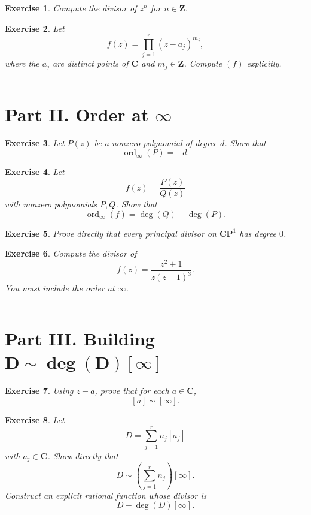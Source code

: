 \documentclass[11pt]{article}
\newtheorem{exercise}{Exercise}
\newcommand{\CP}{\mathbf{CP}^1}
\newcommand{\C}{\mathbf{C}}
\newcommand{\ord}{\operatorname{ord}}
\begin{document}
	\begin{exercise}
		Compute the divisor of \(z^n\) for \(n\in\mathbf{Z}\).
	\end{exercise}
	
	\begin{exercise}
		Let
		\[
		f(z)=\prod_{j=1}^r (z-a_j)^{m_j},
		\]
		where the \(a_j\) are distinct points of \(\C\) and \(m_j\in\mathbf{Z}\).
		Compute \((f)\) explicitly.
	\end{exercise}
	
	\hrule
	\bigskip
	
	\section*{Part II. Order at \(\infty\)}
	
	\begin{exercise}
		Let \(P(z)\) be a nonzero polynomial of degree \(d\). Show that
		\[
		\ord_\infty(P)=-d.
		\]
	\end{exercise}
	
	\begin{exercise}
		Let
		\[
		f(z)=\frac{P(z)}{Q(z)}
		\]
		with nonzero polynomials \(P,Q\). Show that
		\[
		\ord_\infty(f)=\deg(Q)-\deg(P).
		\]
	\end{exercise}
	
	\begin{exercise}
		Prove directly that every principal divisor on \(\CP\) has degree \(0\).
	\end{exercise}
	
	\begin{exercise}
		Compute the divisor of
		\[
		f(z)=\frac{z^2+1}{z(z-1)^3}.
		\]
		You must include the order at \(\infty\).
	\end{exercise}
	
	\hrule
	\bigskip
	
	\section*{Part III. Building \(\boldsymbol{D\sim \deg(D)[\infty]}\)}
	
	\begin{exercise}
		Using \(z-a\), prove that for each \(a\in\C\),
		\[
		[a]\sim [\infty].
		\]
	\end{exercise}
	
	\begin{exercise}
		Let
		\[
		D=\sum_{j=1}^r n_j[a_j]
		\]
		with \(a_j\in\C\). Show directly that
		\[
		D\sim \left(\sum_{j=1}^r n_j\right)[\infty].
		\]
		Construct an explicit rational function whose divisor is
		\[
		D-\deg(D)[\infty].
		\]
	\end{exercise}
	
\end{document}
